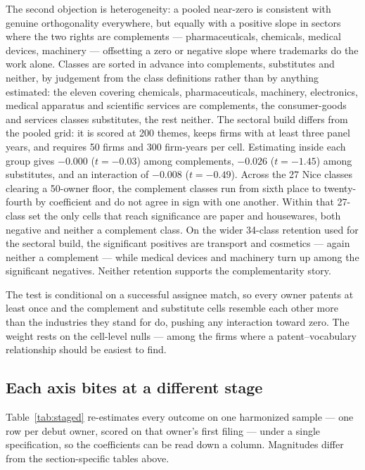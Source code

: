The second objection is heterogeneity: a pooled near-zero is consistent
with genuine orthogonality everywhere, but equally with a positive slope
in sectors where the two rights are complements --- pharmaceuticals,
chemicals, medical devices, machinery --- offsetting a zero or negative
slope where trademarks do the work alone. Classes are sorted in advance into complements, substitutes and neither, by
judgement from the class definitions rather than by anything estimated: the
eleven covering chemicals, pharmaceuticals, machinery, electronics, medical
apparatus and scientific services are complements, the consumer-goods and
services classes substitutes, the rest neither. The sectoral build differs
from the pooled grid: it is scored at 200 themes, keeps firms with at least
three panel years, and requires 50 firms and 300 firm-years per cell.
Estimating inside each group gives $-0.000$
($t = -0.03$) among complements, $-0.026$ ($t = -1.45$) among substitutes,
and an interaction of $-0.008$ ($t = -0.49$). Across the 27 Nice classes
clearing a 50-owner floor, the complement classes run from sixth place to
twenty-fourth by coefficient and do not agree in sign with one another. Within that 27-class set the only cells that reach significance are paper and
housewares, both negative and neither a complement class. On the wider
34-class retention used for the sectoral build, the significant positives are
transport and cosmetics --- again neither a complement --- while medical
devices and machinery turn up among the significant negatives. Neither
retention supports the complementarity story.

The test is conditional on a successful assignee match, so every owner patents at least once and the
complement and substitute cells resemble each other more than the industries
they stand for do, pushing any interaction toward zero. The weight rests on
the cell-level nulls --- among the firms where a patent--vocabulary
relationship should be easiest to find.

\subsection{Each axis bites at a different stage}\label{sec:staged}

Table~\ref{tab:staged} re-estimates every outcome on one harmonized sample
--- one row per debut owner, scored on that owner's first filing --- under a
single specification, so the coefficients can be read down a column. Magnitudes differ from the section-specific tables above.

